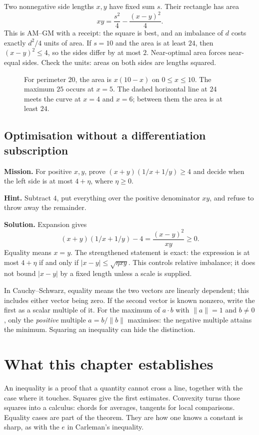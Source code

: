 \begin{examplex}
Two nonnegative side lengths $x,y$ have fixed sum $s$. Their rectangle has area
\[
xy=\frac{s^2}{4}-\frac{(x-y)^2}{4}.
\]
This is AM--GM with a receipt: the square is best, and an imbalance of $d$ costs exactly $d^2/4$ units of area. If $s=10$ and the area is at least $24$, then $(x-y)^2\le4$, so the sides differ by at most $2$. Near-optimal area forces near-equal sides. Check the units: areas on both sides are lengths squared.
\end{examplex}

\begin{figure}[ht]\centering{}
\caption{For perimeter $20$, the area is $x(10-x)$ on $0\le x\le10$. The maximum $25$ occurs at $x=5$. The dashed horizontal line at $24$ meets the curve at $x=4$ and $x=6$; between them the area is at least $24$.}\end{figure}

\subsection*{Optimisation without a differentiation subscription}
\textbf{Mission.} For positive $x,y$, prove $(x+y)(1/x+1/y)\ge4$ and decide when the left side is at most $4+\eta$, where $\eta\ge0$.

\textbf{Hint.} Subtract $4$, put everything over the positive denominator $xy$, and refuse to throw away the remainder.

\textbf{Solution.} Expansion gives
\[
(x+y)(1/x+1/y)-4=\frac{(x-y)^2}{xy}\ge0.
\]
Equality means $x=y$. The strengthened statement is exact: the expression is at most $4+\eta$ if and only if $|x-y|\le\sqrt{\eta xy}$. This controls relative imbalance; it does not bound $|x-y|$ by a fixed length unless a scale is supplied.

\begin{reminder}
In Cauchy--Schwarz, equality means the two vectors are linearly dependent; this includes either vector being zero. If the second vector is known nonzero, write the first as a scalar multiple of it. For the maximum of $a\cdot b$ with $\|a\|=1$ and $b\ne0$, only the \emph{positive} multiple $a=b/\|b\|$ maximises: the negative multiple attains the minimum. Squaring an inequality can hide the distinction.
\end{reminder}

\section*{What this chapter establishes}
An inequality is a proof that a quantity cannot cross a line, together with the case where it touches. Squares give the first estimates. Convexity turns those squares into a calculus: chords for averages, tangents for local comparisons. Equality cases are part of the theorem. They are how one knows a constant is sharp, as with the $e$ in Carleman's inequality.

